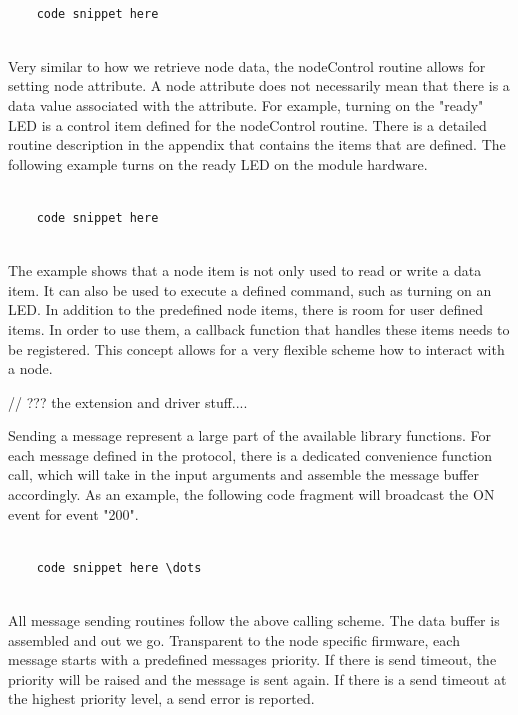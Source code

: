 \lstset{language=c++, style=codesnippetstyle}
\begin{lstlisting}
   
    code snippet here
    
\end{lstlisting}
\FloatBarrier


Very similar to how we retrieve node data, the nodeControl routine allows for setting node attribute. A node attribute does not necessarily mean that there is a data value associated with the attribute. For example, turning on the "ready" LED is a control item defined for the nodeControl routine. There is a detailed routine description in the appendix that contains the items that are defined. The following example turns on the ready LED on the module hardware.

\lstset{language=c++, style=codesnippetstyle}
\begin{lstlisting}
   
    code snippet here
    
\end{lstlisting}
\FloatBarrier

The example shows that a node item is not only used to read or write a data item. It can also be used to execute a defined command, such as turning on an LED. In addition to the predefined node items, there is room for user defined items. In order to use them, a callback function that handles these items needs to be registered. This concept allows for a very flexible scheme how to interact with a node.

// ??? the extension and driver stuff....



Sending a message represent a large part of the available library functions. For each message defined in the protocol, there is a dedicated convenience function call, which will take in the input arguments and assemble the message buffer accordingly. As an example, the following code fragment will broadcast the ON event for event "200".

\lstset{language=c++, style=codesnippetstyle}
\begin{lstlisting}
   
    code snippet here \dots
    
\end{lstlisting}

All message sending routines follow the above calling scheme. The data buffer is assembled and out we go. Transparent to the node specific firmware, each message starts with a predefined messages priority. If there is send timeout, the priority will be raised and the message is sent again. If there is a send timeout at the highest priority level, a send error is reported.


